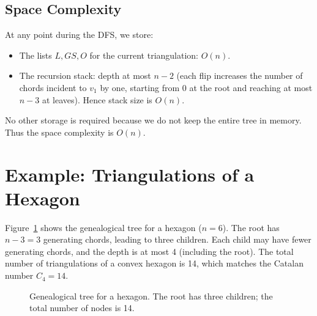 \subsection{Space Complexity}

At any point during the DFS, we store:
\begin{itemize}
    \item The lists \(L, GS, O\) for the current triangulation: \(O(n)\).
    \item The recursion stack: depth at most \(n-2\) (each flip increases the number of chords incident to \(v_1\) by one, starting from 0 at the root and reaching at most \(n-3\) at leaves). 
    Hence stack size is \(O(n)\).
\end{itemize}
No other storage is required because we do not keep the entire tree in memory. 
Thus the space complexity is \(O(n)\).

\section{Example: Triangulations of a Hexagon}
\label{sec:hexagon_example}

Figure~\ref{fig:hexagon_tree} shows the genealogical tree for a hexagon (\(n=6\)). 
The root has \(n-3 = 3\) generating chords, leading to three children. 
Each child may have fewer generating chords, and the depth is at most 4 (including the root). 
The total number of triangulations of a convex hexagon is 14, which matches the Catalan number \(C_4 = 14\).

\begin{figure}[htbp]
    \centering
    \caption{Genealogical tree for a hexagon. The root has three children; the total number of nodes is 14.}
    \label{fig:hexagon_tree}
\end{figure}

